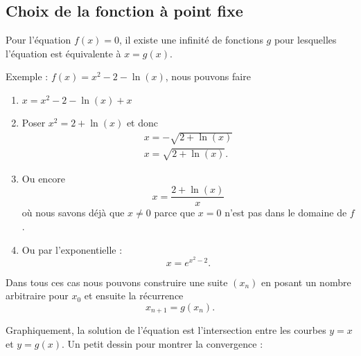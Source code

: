 \subsection{Choix de la fonction à point fixe}

Pour l'équation \( f(x)=0\), il existe une infinité de fonctions \( g\) pour lesquelles l'équation est équivalente à \( x=g(x)\).

Exemple : \( f(x)=x^2-2-\ln(x)\), nous pouvons faire
\begin{enumerate}
    \item
        \( x=x^2-2-\ln(x)+x\)
    \item
        Poser \( x^2=2+\ln(x)\) et donc
        \begin{subequations}
            \begin{align}
                x=-\sqrt{2+\ln(x)}\\
                x=\sqrt{2+\ln(x)}.
            \end{align}
        \end{subequations}
    \item
        Ou encore
        \begin{equation}
            x=\frac{ 2+\ln(x) }{ x }
        \end{equation}
        où nous savons déjà que \( x\neq 0\) parce que \( x=0\) n'est pas dans le domaine de \( f\).
    \item
        Ou par l'exponentielle :
        \begin{equation}
            x= e^{x^2-2}.
        \end{equation}
\end{enumerate}
Dans tous ces cas nous pouvons construire une suite \( (x_n)\) en posant un nombre arbitraire pour \( x_0\) et ensuite la récurrence
\begin{equation}
    x_{n+1}=g(x_n).
\end{equation}

Graphiquement, la solution de l'équation est l'intersection entre les courbes \( y=x\) et \( y=g(x)\). Un petit dessin pour montrer la convergence :

\begin{center}
   
\end{center}

